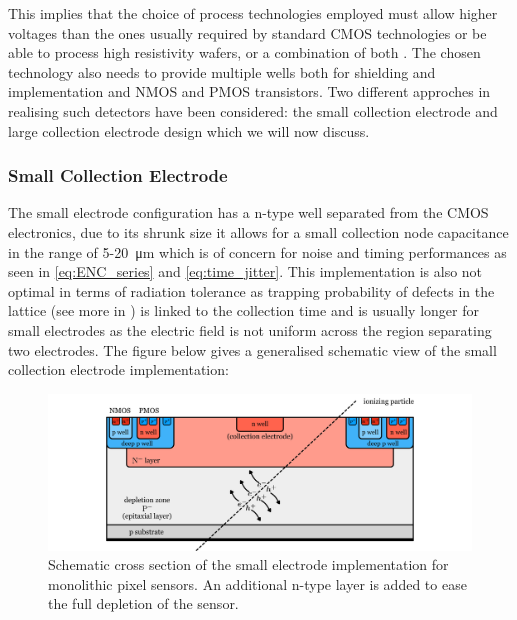 		This implies that the choice of process technologies employed must allow higher voltages than the ones usually required by standard CMOS technologies \cite{peric} or be able to process high resistivity wafers, or a combination of both \cite{detectors}. The chosen technology also needs to provide multiple wells both for shielding and implementation and NMOS and PMOS transistors. Two different approches in realising such detectors have been considered: the small collection electrode and large collection electrode design which we will now discuss.
		
		\subsubsection{Small Collection Electrode}
		The small electrode configuration has a n-type well separated from the CMOS electronics, due to its shrunk size it allows for a small collection node capacitance in the range of 5-\SI{20}{\micro\meter} \cite{detectors} which is of concern for noise and timing performances as seen in \eqref{eq:ENC_series} and \eqref{eq:time_jitter}. This implementation is also not optimal in terms of radiation tolerance as trapping probability of defects in the lattice (see more in ) is linked to the collection time and is usually longer for small electrodes as the electric field is not uniform across the region separating two electrodes. The figure below gives a generalised schematic view of the small collection electrode implementation: 
		\begin{figure}[h]
			\centering
			\includegraphics[width=0.9\linewidth]{files/MAPS_small_electrode}
			\caption{Schematic cross section of the small electrode implementation for monolithic pixel sensors. An additional n-type layer is added to ease the full depletion of the sensor.}
			\label{im:small_electrode}
		\end{figure}
		
